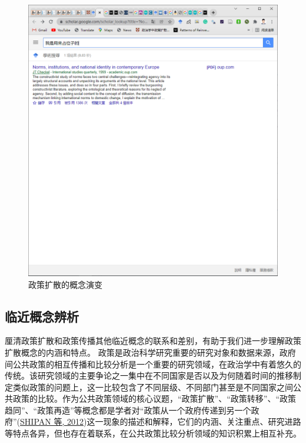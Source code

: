 \documentclass[
  12pt,
]{ctexart}
\begin{document}
\begin{figure}
\includegraphics[width=1\linewidth]{../figures/政策扩散的概念演变} \caption{政策扩散的概念演变}\label{fig:unnamed-chunk-3}
\end{figure}

\hypertarget{ux4e34ux8fd1ux6982ux5ff5ux8fa8ux6790}{%
\subsection{临近概念辨析}\label{ux4e34ux8fd1ux6982ux5ff5ux8fa8ux6790}}

厘清政策扩散和政策传播其他临近概念的联系和差别，有助于我们进一步理解政策扩散概念的内涵和特点。
政策是政治科学研究重要的研究对象和数据来源，政府间公共政策的相互传播和比较分析是一个重要的研究领域，在政治学中有着悠久的传统。该研究领域的主要争论之一集中在不同国家是否以及为何随着时间的推移制定类似政策的问题上，这一比较包含了不同层级、不同部门甚至是不同国家之间公共政策的比较。作为公共政策领域的核心议题，``政策扩散''、``政策转移''、``政策趋同''、``政策再造''等概念都是学者对``政策从一个政府传递到另一个政府''(\protect\hyperlink{ref-ShipanVolden2012}{SHIPAN 等, 2012})这一现象的描述和解释，它们的内涵、关注重点、研究进路等特点各异，但也存在着联系，在公共政策比较分析领域的知识积累上相互补充。
\end{document}
